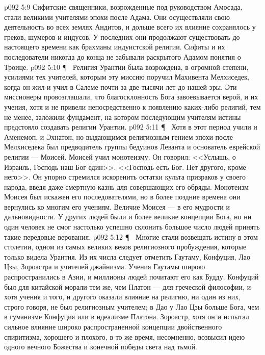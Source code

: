 \vs p092 5:9 \bibnobreakspace {} Сифитские священники, возрожденные под руководством Амосада, стали великими учителями эпохи после Адама. Они осуществляли свою деятельность во всех землях Андитов, и дольше всего их влияние сохранялось у греков, шумеров и индусов. У последних они продолжают существовать до настоящего времени как брахманы индуистской религии. Сифиты и их последователи никогда до конца не забывали раскрытого Адамом понятия о Троице.
\vs p092 5:10 \P\ \bibnobreakspace {} Религия Урантии была возрождена, в огромной степени, усилиями тех учителей, которым эту миссию поручил Махивента Мелхиседек, когда он жил и учил в Салеме почти за две тысячи лет до нашей эры. Эти миссионеры провозглашали, что благосклонность Бога завоевывается верой, и их учения, хотя и не привели непосредственно к появлению каких\hyp{}либо религий, тем не менее, заложили фундамент, на котором последующим учителям истины предстояло создавать религии Урантии.
\vs p092 5:11 \P\ \bibnobreakspace {} Хотя в этот период учили и Аменемоп, и Эхнатон, но выдающимся религиозным гением эпохи после Мелхиседека был предводитель группы бедуинов Леванта и основатель еврейской религии --- Моисей. Моисей учил монотеизму. Он говорил: <<Услышь, о Израиль, Господь наш Бог един>>. <<Господь есть Бог. Нет другого, кроме него>>. Он упорно стремился искоренить остатки культа призраков у своего народа, введя даже смертную казнь для совершающих его обряды. Монотеизм Моисея был искажен его последователями, но в более поздние времена они вернулись ко многим его учениям. Величие Моисея --- в его мудрости и дальновидности. У других людей были и более великие концепции Бога, но ни один человек не смог настолько успешно склонить большое число людей принять такие передовые верования.
\vs p092 5:12 \P\ \bibnobreakspace {} Многие стали возвещать истину в этом столетии, одном из самых великих веков религиозного пробуждения, которые только видела Урантия. Из их числа следует отметить Гаутаму, Конфуция, Лао Цзы, Зороастра и учителей джайнизма. Учения Гаутамы широко распространились в Азии, и миллионы людей почитают его как Будду. Конфуций был для китайской морали тем же, чем Платон --- для греческой философии, и хотя учения и того, и другого оказали влияние на религию, ни один из них, строго говоря, не был религиозным учителем; в Дао у Лао Цзы больше Бога, чем в гуманизме Конфуция или в идеализме Платона. Зороастр, хотя он и испытал сильное влияние широко распространенной концепции двойственного спиритизма, хорошего и плохого, в то же время, несомненно, возвысил идею одного вечного Божества и конечной победы света над тьмой.
